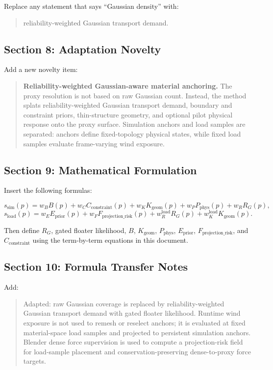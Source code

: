 \documentclass[11pt,a4paper]{article}
\begin{document}
Replace any statement that says ``Gaussian density'' with:

\begin{quote}
reliability-weighted Gaussian transport demand.
\end{quote}

\subsection{Section 8: Adaptation Novelty}

Add a new novelty item:

\begin{quote}
\textbf{Reliability-weighted Gaussian-aware material anchoring.} The proxy resolution is not based on raw Gaussian count. Instead, the method splats reliability-weighted Gaussian transport demand, boundary and constraint priors, thin-structure geometry, and optional pilot physical response onto the proxy surface. Simulation anchors and load samples are separated: anchors define fixed-topology physical states, while fixed load samples evaluate frame-varying wind exposure.
\end{quote}

\subsection{Section 9: Mathematical Formulation}

Insert the following formulas:

\[
s_{\mathrm{sim}}(p)=
 w_B B(p)+w_C C_{\mathrm{constraint}}(p)+w_K K_{\mathrm{geom}}(p)+w_P P_{\mathrm{phys}}(p)+w_R R_G(p),
\]
\[
s_{\mathrm{load}}(p)=w_E E_{\mathrm{prior}}(p)+w_FF_{\mathrm{projection\_risk}}(p)+w_R^{\mathrm{load}}R_G(p)+w_K^{\mathrm{load}}K_{\mathrm{geom}}(p).
\]

Then define $R_G$, gated floater likelihood, $B$, $K_{\mathrm{geom}}$, $P_{\mathrm{phys}}$, $E_{\mathrm{prior}}$, $F_{\mathrm{projection\_risk}}$, and $C_{\mathrm{constraint}}$ using the term-by-term equations in this document.

\subsection{Section 10: Formula Transfer Notes}

Add:

\begin{quote}
Adapted: raw Gaussian coverage is replaced by reliability-weighted Gaussian transport demand with gated floater likelihood. Runtime wind exposure is not used to remesh or reselect anchors; it is evaluated at fixed material-space load samples and projected to persistent simulation anchors. Blender dense force supervision is used to compute a projection-risk field for load-sample placement and conservation-preserving dense-to-proxy force targets.
\end{quote}
\end{document}
